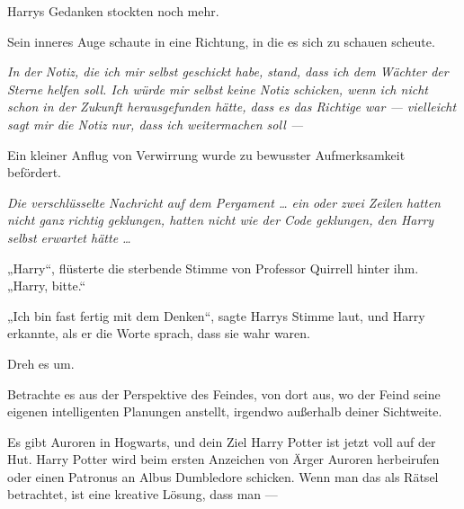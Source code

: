 Harrys Gedanken stockten noch mehr.

Sein inneres Auge schaute in eine Richtung, in die es sich zu schauen scheute.

\emph{In der Notiz, die ich mir selbst geschickt habe, stand, dass ich dem Wächter der Sterne helfen soll. Ich würde mir selbst keine Notiz schicken, wenn ich nicht schon in der Zukunft herausgefunden hätte, dass es das Richtige war — vielleicht sagt mir die Notiz nur, dass ich weitermachen soll —}

Ein kleiner Anflug von Verwirrung wurde zu bewusster Aufmerksamkeit befördert.

\emph{Die verschlüsselte Nachricht auf dem Pergament … ein oder zwei Zeilen hatten nicht ganz richtig geklungen, hatten nicht wie der Code geklungen, den Harry selbst erwartet hätte …}

„Harry“, flüsterte die sterbende Stimme von Professor Quirrell hinter ihm.
„Harry, bitte.“

„Ich bin fast fertig mit dem Denken“, sagte Harrys Stimme laut, und Harry erkannte, als er die Worte sprach, dass sie wahr waren.

Dreh es um.

Betrachte es aus der Perspektive des Feindes, von dort aus, wo der Feind seine eigenen intelligenten Planungen anstellt, irgendwo außerhalb deiner Sichtweite.

Es gibt Auroren in Hogwarts, und dein Ziel Harry Potter ist jetzt voll auf der Hut. Harry Potter wird beim ersten Anzeichen von Ärger Auroren herbeirufen oder einen Patronus an Albus Dumbledore schicken. Wenn man das als Rätsel betrachtet, ist eine kreative Lösung, dass man —

